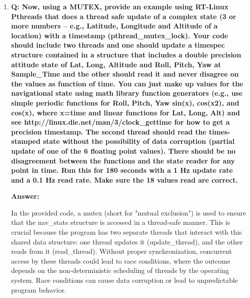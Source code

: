 \documentclass[a4paper,11pt]{article}%
\newenvironment{qanda}{\setlength{\parindent}{0pt}}{\bigskip}
\newcommand{\Q}{\bigskip\bfseries Q: }
\newcommand{\A}{\par\textbf{Answer: } \normalfont}
\begin{document}
\begin{qanda}
\begin{enumerate}
\begin{enumerate}
\begin{enumerate}
\begin{lstlisting}[language=C]
		pthread_t threads[2];
		
		int sharedCounter = 0;
		
		void* task(void * arg){
			for(int i=0; i<10000; i++){
				pthread_mutex_lock(&mutex);
				sharedCounter++;
				printf("Thread %ld, sharedCounter: %d\n", (long)arg, sharedCounter);
				// Unlock the mutex after updating
				pthread_mutex_unlock(&mutex);
			}
		
			return NULL;
		}
		
		
		int main(){
			pthread_mutex_init(&mutex, NULL);
		
			for (long i = 0; i < 2; i++) {
				pthread_create(&threads[i], NULL, task, (void*)i);
			}
		
			for (int i = 0; i < 2; i++) {
				pthread_join(threads[i], NULL);
			}
			pthread_mutex_destroy(&mutex);
			return 0;
		}
								\end{lstlisting}
				      \end{enumerate}

				\item \Q Now, using a MUTEX, provide an example using RT-Linux Pthreads that does a thread
				      safe update of a complex state (3 or more numbers – e.g., Latitude, Longitude and
				      Altitude of a location) with a timestamp (pthread\_mutex\_lock). Your code should
				      include two threads and one should update a timespec structure contained in a structure
				      that includes a double precision attitude state of {Lat, Long, Altitude and Roll, Pitch,
						      Yaw at Sample\_Time} and the other should read it and never disagree on the values as
				      function of time. You can just make up values for the navigational state using math
				      library function generators (e.g., use simple periodic functions for Roll, Pitch, Yaw
				      sin(x), cos(x2), and cos(x), where x=time and linear functions for Lat, Long, Alt) and see
				      http://linux.die.net/man/3/clock\_gettime for how to get a precision timestamp. The
				      second thread should read the times-stamped state without the possibility of data
				      corruption (partial update of one of the 6 floating point values). There should be no
				      disagreement between the functions and the state reader for any point in time. Run this
				      for 180 seconds with a 1 Hz update rate and a 0.1 Hz read rate. Make sure the 18 values
				      read are correct.

				      \A

				      In the provided code, a mutex (short for "mutual exclusion") is used to ensure that the nav\_state structure is accessed in a thread-safe manner. This is crucial because the program has two separate threads that interact with this shared data structure: one thread updates it (update\_thread), and the other reads from it (read\_thread). Without proper synchronization, concurrent access by these threads could lead to race conditions, where the outcome depends on the non-deterministic scheduling of threads by the operating system. Race conditions can cause data corruption or lead to unpredictable program behavior.


\end{enumerate}
\end{enumerate}
\end{qanda}
\end{document}

